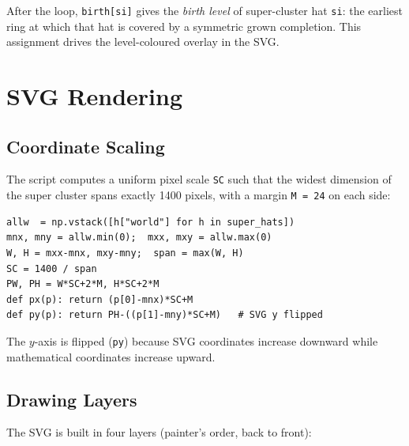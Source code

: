 \documentclass[10pt,a4paper]{article}
\let\polysection\section
\renewcommand\section{\needspace{0.16\textheight}\polysection}
\let\polysubsection\subsection
\renewcommand\subsection{\needspace{0.12\textheight}\polysubsection}
\newcommand{\code}[1]{\texttt{\small #1}}
\begin{document}
\noindent After the loop, \code{birth[si]} gives the \emph{birth level} of
super-cluster hat \code{si}: the earliest ring at which that hat is
covered by a symmetric grown completion.  This assignment drives the
level-coloured overlay in the SVG.

\section{SVG Rendering}

\subsection{Coordinate Scaling}

The script computes a uniform pixel scale \code{SC} such that the widest
dimension of the super cluster spans exactly 1400 pixels, with a margin
\code{M = 24} on each side:

\begin{verbatim}
allw  = np.vstack([h["world"] for h in super_hats])
mnx, mny = allw.min(0);  mxx, mxy = allw.max(0)
W, H = mxx-mnx, mxy-mny;  span = max(W, H)
SC = 1400 / span
PW, PH = W*SC+2*M, H*SC+2*M
def px(p): return (p[0]-mnx)*SC+M
def py(p): return PH-((p[1]-mny)*SC+M)   # SVG y flipped
\end{verbatim}

The $y$-axis is flipped (\code{py}) because SVG coordinates increase downward
while mathematical coordinates increase upward.

\subsection{Drawing Layers}

The SVG is built in four layers (painter's order, back to front):
\end{document}

